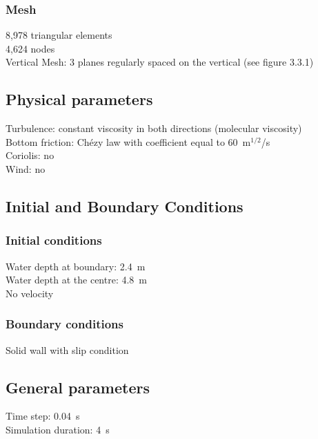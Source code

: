 \subsubsection{Mesh}
%
8,978 triangular elements\\
4,624 nodes\\
Vertical Mesh: 3 planes regularly spaced on the vertical
(see figure 3.3.1)
%
%
%
\subsection{Physical parameters}
%
Turbulence: constant viscosity in both directions
(molecular viscosity)\\
Bottom friction: Chézy law with coefficient equal to 60~m$^{1/2}$/s\\
Coriolis: no\\
Wind: no
%
%
%
%
%
%
\subsection{Initial and Boundary Conditions}
%
\subsubsection{Initial conditions}
%
Water depth at boundary: 2.4~m\\
Water depth at the centre: 4.8~m\\
No velocity
%
\subsubsection{Boundary conditions}
%
Solid wall with slip condition
%
\subsection{General parameters}
%
Time step: 0.04~s\\
Simulation duration: 4~s
%
%
%
